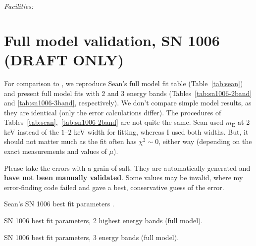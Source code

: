 \documentclass[iop, apj, numberedappendix, twocolappendix]{emulateapj}
\newcommand*{\mE}{m_\mathrm{E}}
\begin{document}
{\it Facilities:} 

\clearpage

\appendix

\setcounter{table}{0}
\renewcommand{\thetable}{A\arabic{table}}
\setcounter{figure}{0}
\renewcommand{\thefigure}{A\arabic{figure}}

\section{Full model validation, SN 1006 (DRAFT ONLY)}

For comparison to , we reproduce Sean's full model fit
table (Table~\ref{tab:sean}) and present full model fits with 2 and 3 energy
bands (Tables~\ref{tab:sn1006-2band} and \ref{tab:sn1006-3band}, respectively).
We don't compare simple model results, as they are identical (only the error
calculations differ).
The procedures of Tables~\ref{tab:sean},~\ref{tab:sn1006-2band} are not quite
the same.  Sean used $\mE$ at 2 keV instead of the $1$--$2$ keV width for
fitting, whereas I used both widths.  But, it should not matter much as
the fit often has $\chi^2 \sim 0$, either way (depending on the exact
measurements and values of $\mu$).

Please take the errors with a grain of salt.  They are automatically
generated and \textbf{have not been manually validated}.  Some values may be
invalid, where my error-finding code failed and gave a best, conservative guess
of the error.

\begin{table}[ht]
    \tiny
    \centering
    \caption{Sean's SN 1006 best fit parameters .
    \label{tab:sean}}
    
\end{table}

\begin{table*}[ht]
    \tiny
    \centering
    \caption{SN 1006 best fit parameters, 2 highest energy bands (full model).
    \label{tab:sn1006-2band}}
    
\end{table*}

\begin{table*}[ht]
    \tiny
    \centering
    \caption{SN 1006 best fit parameters, 3 energy bands (full model).
    \label{tab:sn1006-3band}}
    
\end{table*}


\end{document}
